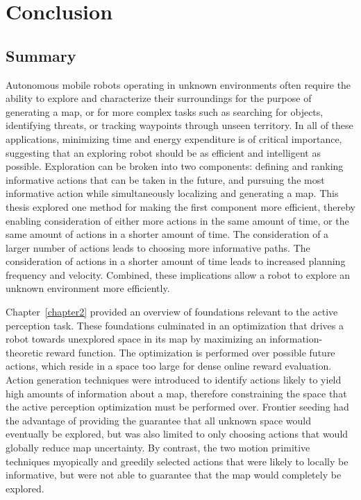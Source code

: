 \chapter{Conclusion}
\label{chapter5}

\section{Summary}

Autonomous mobile robots operating in unknown environments often require the
ability to explore and characterize their surroundings for the purpose of
generating a map, or for more complex tasks such as searching for objects,
identifying threats, or tracking waypoints through unseen territory. In all of
these applications, minimizing time and energy expenditure is of critical importance,
suggesting that an exploring robot should be as efficient and intelligent as
possible. Exploration can be broken into two components: defining and ranking informative
actions that can be taken in the future, and pursuing the most informative action while
simultaneously localizing and generating a map. This thesis explored one method for
making the first component more efficient, thereby enabling consideration of
either more actions in the same amount of time, or the same amount of
actions in a shorter amount of time. The consideration of a larger number of
actions leads to choosing more informative paths. The consideration of
actions in a shorter amount of time leads to increased planning
frequency and velocity. Combined, these implications allow a robot to explore
an unknown environment more efficiently.

Chapter~\ref{chapter2} provided an overview of foundations relevant to the
active perception task. These foundations culminated in an optimization that
drives a robot towards unexplored space in its map by maximizing an
information-theoretic reward function. The optimization is performed over
possible future actions, which reside in a space too large for dense online
reward evaluation. Action generation techniques were introduced to identify actions
likely to yield high amounts of information about a map, therefore
constraining the space that the active perception optimization must be performed
over. Frontier seeding had the advantage of providing the guarantee that all
unknown space would eventually be explored, but was also limited to only choosing
actions that would globally reduce map uncertainty. By contrast, the two motion
primitive techniques myopically and greedily selected actions that were likely to
locally be informative, but were not able to guarantee that the map would completely be
explored.


